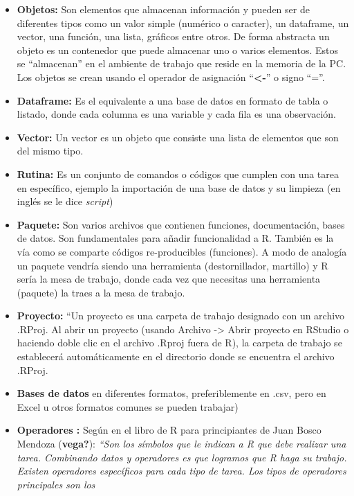 \documentclass[
  letterpaper,
  DIV=11,
  numbers=noendperiod]{scrreprt}
\begin{document}
\begin{itemize}
\item
  \textbf{Objetos:} Son elementos que almacenan información y pueden ser
  de diferentes tipos como un valor simple (numérico o caracter), un
  dataframe, un vector, una función, una lista, gráficos entre otros. De
  forma abstracta un objeto es un contenedor que puede almacenar uno o
  varios elementos. Estos se ``almacenan'' en el ambiente de trabajo que
  reside en la memoria de la PC. Los objetos se crean usando el operador
  de asignación ``\textbf{\textless-}'' o signo ``=''.
\item
  \textbf{Dataframe:} Es el equivalente a una base de datos en formato
  de tabla o listado, donde cada columna es una variable y cada fila es
  una observación.
\item
  \textbf{Vector:} Un vector es un objeto que consiste una lista de
  elementos que son del mismo tipo.
\item
  \textbf{Rutina:} Es un conjunto de comandos o códigos que cumplen con
  una tarea en específico, ejemplo la importación de una base de datos y
  su limpieza (en inglés se le dice \emph{script})
\item
  \textbf{Paquete:} Son varios archivos que contienen funciones,
  documentación, bases de datos. Son fundamentales para añadir
  funcionalidad a R. También es la vía como se comparte códigos
  re-producibles (funciones). A modo de analogía un paquete vendría
  siendo una herramienta (destornillador, martillo) y R sería la mesa de
  trabajo, donde cada vez que necesitas una herramienta (paquete) la
  traes a la mesa de trabajo.
\item
  \textbf{Proyecto:} ``Un proyecto es una carpeta de trabajo designado
  con un archivo .RProj. Al abrir un proyecto (usando Archivo
  -\textgreater{} Abrir proyecto en RStudio o haciendo doble clic en el
  archivo .Rproj fuera de R), la carpeta de trabajo se establecerá
  automáticamente en el directorio donde se encuentra el archivo .RProj.
\item
  \textbf{Bases de datos} en diferentes formatos, preferiblemente en
  .csv, pero en Excel u otros formatos comunes se pueden trabajar)
\item
  \textbf{Operadores :} Según en el libro de R para principiantes de
  Juan Bosco Mendoza (\textbf{vega?}): \emph{``Son los símbolos que le
  indican a R que debe realizar una tarea. Combinando datos y operadores
  es que logramos que R haga su trabajo. Existen operadores específicos
  para cada tipo de tarea. Los tipos de operadores principales son los
}
\end{itemize}
\end{document}
